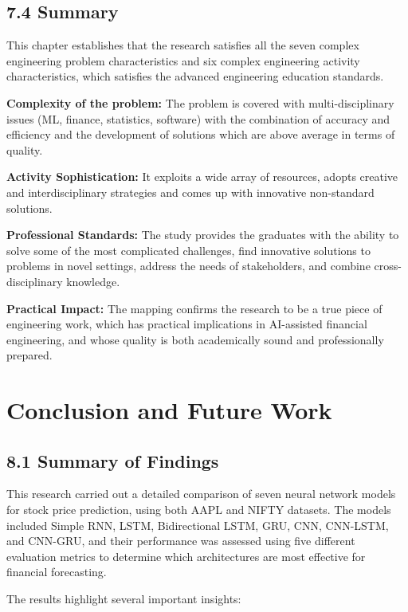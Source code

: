 \documentclass[12pt,a4paper]{report}
\begin{document}
\section{7.4 Summary}
This chapter establishes that the research satisfies all the seven complex engineering problem characteristics and six complex engineering activity characteristics, which satisfies the advanced engineering education standards.

\textbf{Complexity of the problem:} The problem is covered with multi-disciplinary issues (ML, finance, statistics, software) with the combination of accuracy and efficiency and the development of solutions which are above average in terms of quality. 

\textbf{Activity Sophistication:} It exploits a wide array of resources, adopts creative and interdisciplinary strategies and comes up with innovative non-standard solutions. 

\textbf{Professional Standards:} The study provides the graduates with the ability to solve some of the most complicated challenges, find innovative solutions to problems in novel settings, address the needs of stakeholders, and combine cross-disciplinary knowledge. 

\textbf{Practical Impact:} The mapping confirms the research to be a true piece of engineering work, which has practical implications in AI-assisted financial engineering, and whose quality is both academically sound and professionally prepared.

\chapter{Conclusion and Future Work}
\label{ch:8}
\section{8.1 Summary of Findings}
This research carried out a detailed comparison of seven neural network models for stock price prediction, using both AAPL and NIFTY datasets. The models included Simple RNN, LSTM, Bidirectional LSTM, GRU, CNN, CNN-LSTM, and CNN-GRU, and their performance was assessed using five different evaluation metrics to determine which architectures are most effective for financial forecasting.

The results highlight several important insights:
\end{document}
